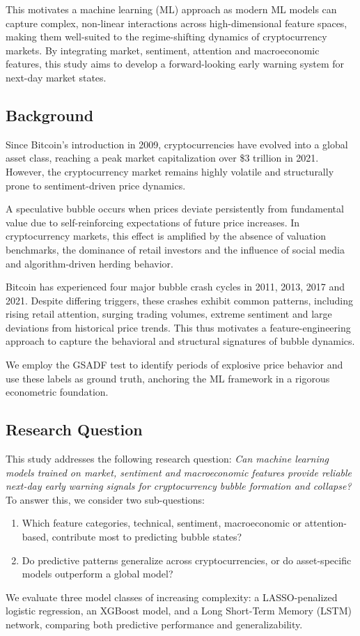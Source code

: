 \documentclass[12pt,a4paper]{article}
\begin{document}
This motivates a machine learning (ML) approach as modern ML models can capture complex, non-linear interactions across high-dimensional feature spaces, making them well-suited to the regime-shifting dynamics of cryptocurrency markets. By integrating market, sentiment, attention and macroeconomic features, this study aims to develop a forward-looking early warning system for next-day market states.

\subsection{Background}

Since Bitcoin's introduction in 2009, cryptocurrencies have evolved into a global asset class, reaching a peak market capitalization over \$3 trillion in 2021. However, the cryptocurrency market remains highly volatile and structurally prone to sentiment-driven price dynamics. 

A speculative bubble occurs when prices deviate persistently from fundamental value due to self-reinforcing expectations of future price increases. In cryptocurrency markets, this effect is amplified by the absence of valuation benchmarks, the dominance of retail investors and the influence of social media and algorithm-driven herding behavior. 

Bitcoin has experienced four major bubble crash cycles in 2011, 2013, 2017 and 2021. Despite differing triggers, these crashes exhibit common patterns, including rising retail attention, surging trading volumes, extreme sentiment and large deviations from historical price trends. This thus motivates a feature-engineering approach to capture the behavioral and structural signatures of bubble dynamics. 

We employ the GSADF test to identify periods of explosive price behavior and use these labels as ground truth, anchoring the ML framework in a rigorous econometric foundation. 

\subsection{Research Question}

This study addresses the following research question: 
\textit{Can machine learning models trained on market, sentiment and macroeconomic features provide reliable next-day early warning signals for cryptocurrency bubble formation and collapse?}    
To answer this, we consider two sub-questions:
\begin{enumerate}
    \item Which feature categories, technical, sentiment, macroeconomic or attention-based, contribute most to predicting bubble states?
    \item Do predictive patterns generalize across cryptocurrencies, or do asset-specific models outperform a global model?
\end{enumerate}
We evaluate three model classes of increasing complexity: a LASSO-penalized logistic regression, an XGBoost model, and a Long Short-Term Memory (LSTM) network, comparing both predictive performance and generalizability. 
\end{document}
